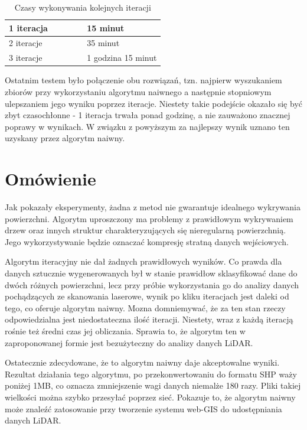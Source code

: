 \begin{table}[h!]
    \centering
    \begin{tabular}{|p{0.5\linewidth}|p{0.5\linewidth}|}
        \hline
		1 iteracja & 15 minut \\
		\hline
		2 iteracje & 35 minut \\
		\hline
		3 iteracje & 1 godzina 15 minut \\
		\hline
    \end{tabular}
    \caption{Czasy wykonywania kolejnych iteracji}
    \label{tab:iter_czasy}
\end{table}


Ostatnim testem było połączenie obu rozwiązań, tzn. najpierw wyszukaniem zbiorów
przy wykorzystaniu algorytmu naiwnego a następnie stopniowym ulepszaniem jego wyniku
poprzez iteracje. Niestety takie podejście okazało się być zbyt czasochłonne - 1 iteracja
trwała ponad godzinę, a nie zauważono znacznej poprawy w wynikach. W związku z powyższym
za najlepszy wynik uznano ten uzyskany przez algorytm naiwny.

\section{Omówienie}

Jak pokazały eksperymenty, żadna z metod nie gwarantuje idealnego wykrywania powierzchni. Algorytm
uproszczony ma problemy z prawidłowym wykrywaniem drzew oraz innych struktur charakteryzujących się
nieregularną powierzchnią. Jego wykorzystywanie będzie oznaczać kompresję stratną danych wejściowych.

Algorytm iteracyjny nie dał żadnych prawidłowych wyników. Co prawda dla danych sztucznie wygenerowanych
był w stanie prawidłow sklasyfikować dane do dwóch różnych powierzchni, lecz przy próbie wykorzystania
go do analizy danych pochądzących ze skanowania laserowe, wynik po kliku iteracjach jest daleki od tego, co oferuje algorytm naiwny. Mozna
domniemywać, że za ten stan rzeczy odpowiedzialna jest niedostateczna ilość iteracji. Niestety, wraz
z każdą iteracją rośnie też średni czas jej obliczania. Sprawia to, że algorytm ten w zaproponowanej formie
jest bezużyteczny do analizy danych LiDAR.

Ostatecznie zdecydowane, że to algorytm naiwny daje akceptowalne wyniki. Rezultat działania tego algorytmu,
po przekonwertowaniu do formatu SHP waży poniżej 1MB, co oznacza zmniejszenie wagi danych niemalże 180 razy.
Pliki takiej wielkości można szybko przesyłać poprzez sieć. Pokazuje to, że algorytm naiwny może znaleźć
zatosowanie przy tworzenie systemu web-GIS do udostępniania danych LiDAR.
